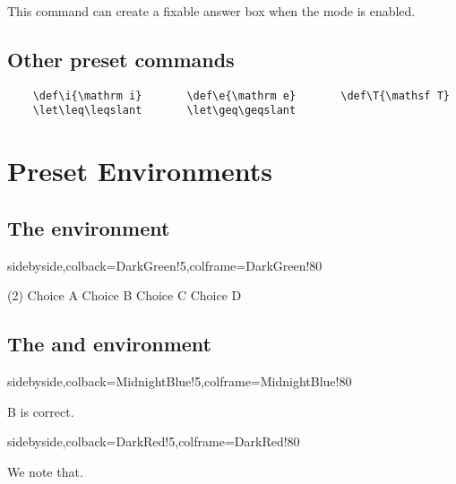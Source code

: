\documentclass[ans,mtpro2]{litesolution}
\begin{document}
This command can create a fixable answer box when the mode  is enabled.

\subsection{Other preset commands}

\begin{verbatim}
    \def\i{\mathrm i}       \def\e{\mathrm e}       \def\T{\mathsf T}
    \let\leq\leqslant       \let\geq\geqslant
\end{verbatim}

\section{Preset  Environments}

\subsection{The  environment}

\begin{tcblisting}{sidebyside,colback=DarkGreen!5,colframe=DarkGreen!80}
\begin{problem}\leavevmode
\begin{tasks}(2)
  \task Choice A  \task[\true] Choice B
  \task Choice C  \task Choice D
\end{tasks}
\end{problem}
\end{tcblisting}

\subsection{The  and  environment}

\begin{minipage}{.48\textwidth}
\begin{tcblisting}{sidebyside,colback=MidnightBlue!5,colframe=MidnightBlue!80}
\begin{solution}
  B is correct.
\end{solution}
\end{tcblisting}
\end{minipage}
\hfill
\begin{minipage}{.48\textwidth}
\begin{tcblisting}{sidebyside,colback=DarkRed!5,colframe=DarkRed!80}
\begin{note}
  We note that.
\end{note}
\end{tcblisting}    
\end{minipage}
\end{document}
